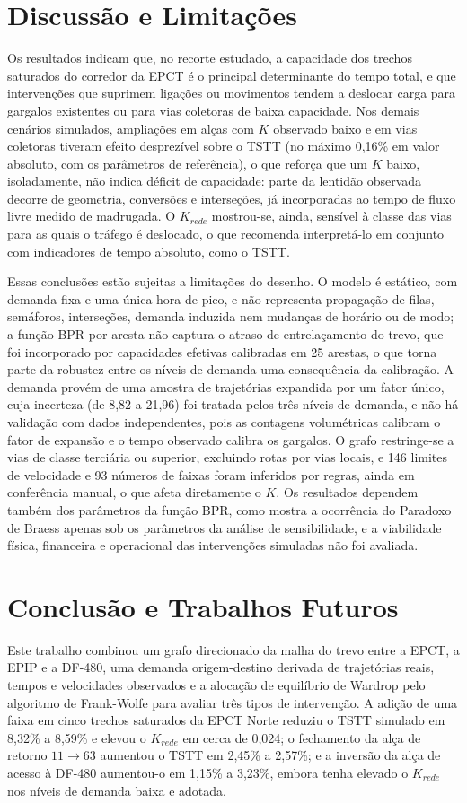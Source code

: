\documentclass[portuguese]{sbc2025}%
\begin{document}
\section{Discussão e Limitações}
Os resultados indicam que, no recorte estudado, a capacidade dos trechos saturados do corredor da EPCT é o principal determinante do tempo total, e que intervenções que suprimem ligações ou movimentos tendem a deslocar carga para gargalos existentes ou para vias coletoras de baixa capacidade. Nos demais cenários simulados, ampliações em alças com $K$ observado baixo e em vias coletoras tiveram efeito desprezível sobre o TSTT (no máximo 0,16\% em valor absoluto, com os parâmetros de referência), o que reforça que um $K$ baixo, isoladamente, não indica déficit de capacidade: parte da lentidão observada decorre de geometria, conversões e interseções, já incorporadas ao tempo de fluxo livre medido de madrugada. O $K_{rede}$ mostrou-se, ainda, sensível à classe das vias para as quais o tráfego é deslocado, o que recomenda interpretá-lo em conjunto com indicadores de tempo absoluto, como o TSTT.

Essas conclusões estão sujeitas a limitações do desenho. O modelo é estático, com demanda fixa e uma única hora de pico, e não representa propagação de filas, semáforos, interseções, demanda induzida nem mudanças de horário ou de modo; a função BPR por aresta não captura o atraso de entrelaçamento do trevo, que foi incorporado por capacidades efetivas calibradas em 25 arestas, o que torna parte da robustez entre os níveis de demanda uma consequência da calibração. A demanda provém de uma amostra de trajetórias expandida por um fator único, cuja incerteza (de 8,82 a 21,96) foi tratada pelos três níveis de demanda, e não há validação com dados independentes, pois as contagens volumétricas calibram o fator de expansão e o tempo observado calibra os gargalos. O grafo restringe-se a vias de classe terciária ou superior, excluindo rotas por vias locais, e 146 limites de velocidade e 93 números de faixas foram inferidos por regras, ainda em conferência manual, o que afeta diretamente o $K$. Os resultados dependem também dos parâmetros da função BPR, como mostra a ocorrência do Paradoxo de Braess apenas sob os parâmetros da análise de sensibilidade, e a viabilidade física, financeira e operacional das intervenções simuladas não foi avaliada.

\section{Conclusão e Trabalhos Futuros}
Este trabalho combinou um grafo direcionado da malha do trevo entre a EPCT, a EPIP e a DF-480, uma demanda origem-destino derivada de trajetórias reais, tempos e velocidades observados e a alocação de equilíbrio de Wardrop pelo algoritmo de Frank-Wolfe para avaliar três tipos de intervenção. A adição de uma faixa em cinco trechos saturados da EPCT Norte reduziu o TSTT simulado em 8,32\% a 8,59\% e elevou o $K_{rede}$ em cerca de 0,024; o fechamento da alça de retorno $11\rightarrow63$ aumentou o TSTT em 2,45\% a 2,57\%; e a inversão da alça de acesso à DF-480 aumentou-o em 1,15\% a 3,23\%, embora tenha elevado o $K_{rede}$ nos níveis de demanda baixa e adotada.
\end{document}
